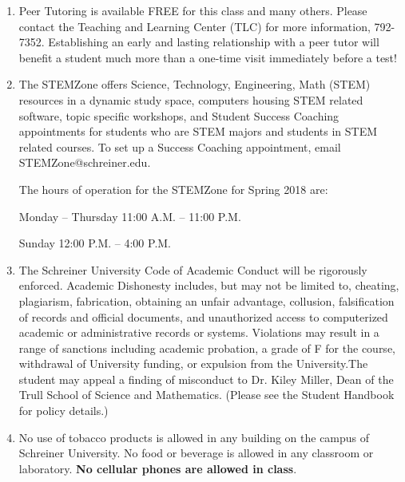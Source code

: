 \documentclass[11pt, a4paper]{article}
\begin{document}
\begin{enumerate}
\item Peer Tutoring is available FREE for this class and many others.  Please contact the Teaching and Learning Center (TLC) for more information, 792-7352.  Establishing an early and lasting relationship with a peer tutor will benefit a student much more than a one-time visit immediately before a test!

\item The STEMZone offers Science, Technology, Engineering, Math (STEM) resources in a dynamic study space, computers housing STEM related software, topic specific workshops, and Student Success Coaching appointments for students who are STEM majors and students in STEM related courses. To set up a Success Coaching appointment, email STEMZone@schreiner.edu.

The hours of operation for the STEMZone for Spring 2018 are:

Monday – Thursday 11:00 A.M. – 11:00 P.M.

Sunday 12:00 P.M. – 4:00 P.M. 

\item The Schreiner University Code of Academic Conduct will be rigorously enforced. Academic Dishonesty includes, but may not be limited to, cheating, plagiarism, fabrication, obtaining an unfair advantage, collusion, falsification of records and official documents, and unauthorized access to computerized academic or administrative records or systems. Violations may result in a range of sanctions including academic probation, a grade of F for the course, withdrawal of University funding, or expulsion from the University.The student may appeal a finding of misconduct to Dr. Kiley Miller, Dean of the Trull School of Science and Mathematics. (Please see the Student Handbook for policy details.)

\item No use of tobacco products is allowed in any building on the campus of Schreiner University.  No food or beverage is allowed in any classroom or laboratory. \textbf{No cellular phones are allowed in class}.
\end{enumerate}


\newpage
\end{document}
